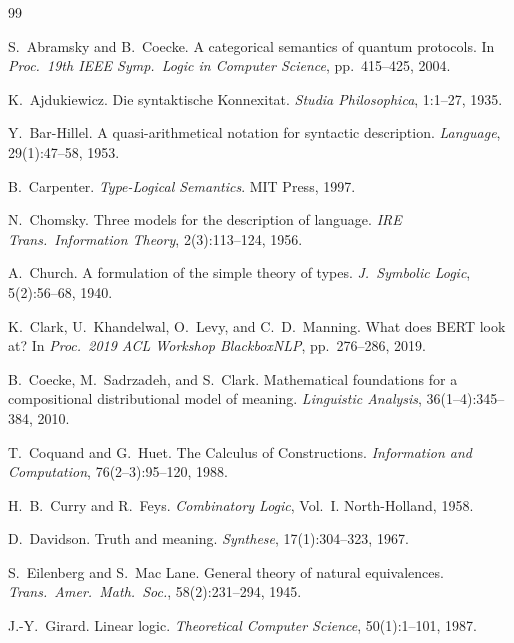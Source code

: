 \documentclass[12pt,a4paper]{article}
\begin{document}
\begin{thebibliography}{99}

S.~Abramsky and B.~Coecke.
\newblock A categorical semantics of quantum protocols.
\newblock In \emph{Proc.\ 19th IEEE Symp.\ Logic in Computer Science}, pp.~415--425, 2004.

K.~Ajdukiewicz.
\newblock Die syntaktische Konnexitat.
\newblock \emph{Studia Philosophica}, 1:1--27, 1935.

Y.~Bar-Hillel.
\newblock A quasi-arithmetical notation for syntactic description.
\newblock \emph{Language}, 29(1):47--58, 1953.

B.~Carpenter.
\newblock \emph{Type-Logical Semantics}.
\newblock MIT Press, 1997.

N.~Chomsky.
\newblock Three models for the description of language.
\newblock \emph{IRE Trans.\ Information Theory}, 2(3):113--124, 1956.

A.~Church.
\newblock A formulation of the simple theory of types.
\newblock \emph{J.\ Symbolic Logic}, 5(2):56--68, 1940.

K.~Clark, U.~Khandelwal, O.~Levy, and C.~D.~Manning.
\newblock What does BERT look at?
\newblock In \emph{Proc.\ 2019 ACL Workshop BlackboxNLP}, pp.~276--286, 2019.

B.~Coecke, M.~Sadrzadeh, and S.~Clark.
\newblock Mathematical foundations for a compositional distributional model of meaning.
\newblock \emph{Linguistic Analysis}, 36(1--4):345--384, 2010.

T.~Coquand and G.~Huet.
\newblock The Calculus of Constructions.
\newblock \emph{Information and Computation}, 76(2--3):95--120, 1988.

H.~B.~Curry and R.~Feys.
\newblock \emph{Combinatory Logic}, Vol.~I.
\newblock North-Holland, 1958.

D.~Davidson.
\newblock Truth and meaning.
\newblock \emph{Synthese}, 17(1):304--323, 1967.

S.~Eilenberg and S.~Mac Lane.
\newblock General theory of natural equivalences.
\newblock \emph{Trans.\ Amer.\ Math.\ Soc.}, 58(2):231--294, 1945.

J.-Y.~Girard.
\newblock Linear logic.
\newblock \emph{Theoretical Computer Science}, 50(1):1--101, 1987.


\end{thebibliography}
\end{document}
